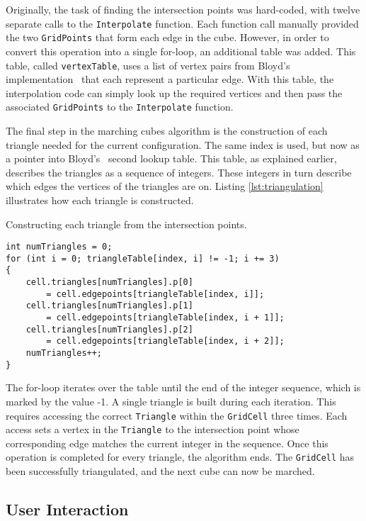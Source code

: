 \documentclass[pageno]{jpaper}
\begin{document}
Originally, the task of finding the intersection points was hard-coded, with twelve separate calls to the \texttt{Interpolate} function. Each function call manually provided the two \texttt{GridPoints} that form each edge in the cube. However, in order to convert this operation into a single for-loop, an additional table was added. This table, called \texttt{vertexTable}, uses a list of vertex pairs from Bloyd's implementation~\cite{bloyd} that each represent a particular edge. With this table, the interpolation code can simply look up the required vertices and then pass the associated \texttt{GridPoints} to the \texttt{Interpolate} function.

The final step in the marching cubes algorithm is the construction of each triangle needed for the current configuration. The same index is used, but now as a pointer into Bloyd's~\cite{bloyd} second lookup table. This table, as explained earlier, describes the triangles as a sequence of integers. These integers in turn describe which edges the vertices of the triangles are on. Listing \ref{lst:triangulation} illustrates how each triangle is constructed.

\begin{listing}[H]
\linespread{1.0}
\caption{Constructing each triangle from the intersection points.}
\begin{verbatim}
int numTriangles = 0;
for (int i = 0; triangleTable[index, i] != -1; i += 3)
{
    cell.triangles[numTriangles].p[0]
        = cell.edgepoints[triangleTable[index, i]];
    cell.triangles[numTriangles].p[1]
        = cell.edgepoints[triangleTable[index, i + 1]];
    cell.triangles[numTriangles].p[2]
        = cell.edgepoints[triangleTable[index, i + 2]];
    numTriangles++;
}
\end{verbatim}
\label{lst:triangulation}
\end{listing}

The for-loop iterates over the table until the end of the integer sequence, which is marked by the value -1. A single triangle is built during each iteration. This requires accessing the correct \texttt{Triangle} within the \texttt{GridCell} three times. Each access sets a vertex in the \texttt{Triangle} to the intersection point whose corresponding edge matches the current integer in the sequence. Once this operation is completed for every triangle, the algorithm ends. The \texttt{GridCell} has been successfully triangulated, and the next cube can now be marched.

\subsection{User Interaction}
\end{document}
